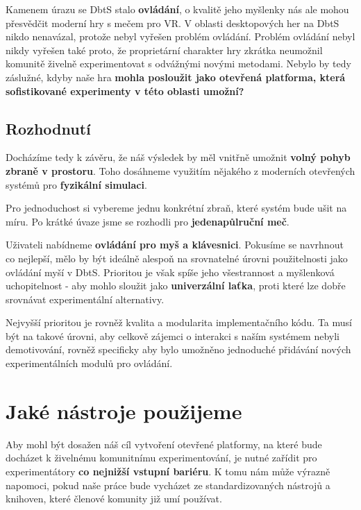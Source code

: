 Kamenem úrazu se \acl{DbtS} stalo \textbf{ovládání}, o kvalitě jeho myšlenky nás ale mohou přesvědčit moderní hry s mečem pro VR. V oblasti desktopových her na \acl{DbtS} nikdo nenavázal, protože nebyl vyřešen problém ovládání. Problém ovládání nebyl nikdy vyřešen také proto, že proprietární charakter hry zkrátka neumožnil komunitě živelně experimentovat s odvážnými novými metodami. Nebylo by tedy záslužné, kdyby naše hra \textbf{mohla posloužit jako otevřená platforma, která sofistikované experimenty v této oblasti umožní?} 

\subsection{Rozhodnutí}

Docházíme tedy k závěru, že náš výsledek by měl vnitřně umožnit \textbf{volný pohyb zbraně v prostoru}. Toho dosáhneme využitím nějakého z moderních otevřených systémů pro \textbf{fyzikální simulaci}.

Pro jednoduchost si vybereme jednu konkrétní zbraň, které systém bude ušit na míru. Po krátké úvaze jsme se rozhodli pro \textbf{jedenapůlruční meč}.

Uživateli nabídneme \textbf{ovládání pro myš a klávesnici}. Pokusíme se navrhnout co nejlepší, mělo by být ideálně alespoň na srovnatelné úrovni použitelnosti jako ovládání myší v \acs{DbtS}. Prioritou je však spíše jeho všestrannost a myšlenková uchopitelnost - aby mohlo sloužit jako \textbf{univerzální laťka}, proti které lze dobře srovnávat experimentální alternativy. 

Nejvyšší prioritou je rovněž kvalita a modularita implementačního kódu. Ta musí být na takové úrovni, aby celkově zájemci o interakci s naším systémem nebyli demotivování, rovněž specificky aby bylo umožněno jednoduché přidávání nových experimentálních modulů pro ovládání.

\section{Jaké nástroje použijeme}

Aby mohl být dosažen náš cíl vytvoření otevřené platformy, na které bude docházet k živelnému komunitnímu experimentování, je nutné zařídit pro experimentátory \textbf{co nejnižší vstupní bariéru}. K tomu nám může výrazně napomoci, pokud naše práce bude vycházet ze standardizovaných nástrojů a knihoven, které členové komunity již umí používat.


